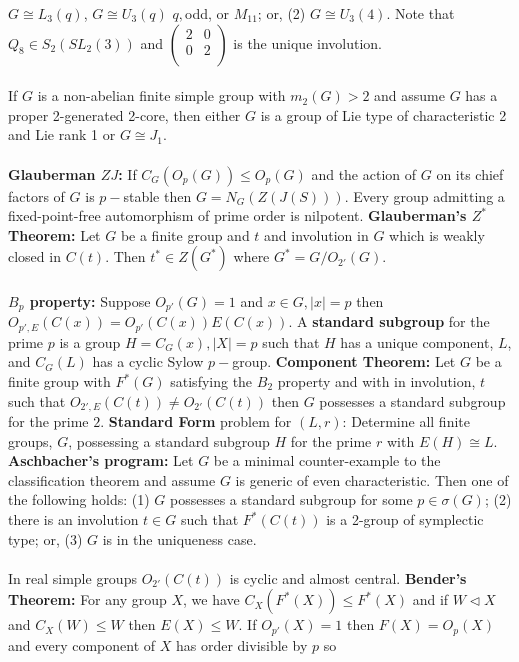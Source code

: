 $G \cong L_3(q)$,
$G \cong U_3(q)$ $q, $odd, or $M_{11}$; or,  (2)
$G \cong U_3(4)$.
Note that $Q_8 \in S_2(SL_2(3))$ and 
$\left(
\begin{array}{cc}
2 &  0 \\
0 &  2 \\
\end{array}
\right)$ is the unique involution.\\
\\
If $G$ is a non-abelian finite simple group
with $m_2(G) > 2$ and assume $G$ has a proper 2-generated 2-core, then either
$G$ is a group of Lie type of characteristic 2 and Lie rank 1 or $G \cong J_1$.\\
\\
{\bf Glauberman $ZJ$:}  If $C_G(O_p(G)) \le O_p(G)$ and the action of
$G$ on its chief factors of $G$ is $p-$stable then $G=N_G(Z(J(S)))$. Every group
admitting a fixed-point-free automorphism of prime order is nilpotent.
{\bf Glauberman's $Z^*$ Theorem:}
Let $G$ be a finite group and $t$ and involution in $G$ which is weakly closed in
$C(t)$.  Then $t^* \in Z(G^*)$  where $G^*= G/O_{2'} (G)$.\\
\\
{\bf $B_p$ property:} Suppose $O_{p'}(G)=1$ and $x \in G, |x|=p$ then
$O_{p',E}(C(x))= O_{p'}(C(x))E(C(x))$.
A {\bf standard subgroup} for the prime $p$ is a group $H=C_G(x), |X|=p$ such that
$H$ has a unique component, $L$, and $C_G(L)$ has a cyclic Sylow $p-$group.
{\bf Component Theorem:}
Let $G$ be a finite group with $F^*(G)$ satisfying the $B_2$ property and with
in involution, $t$ such that $O_{2', E} (C(t)) \ne O_{2'} (C(t))$ then $G$ possesses
a standard subgroup for the prime $2$.
{\bf Standard Form} problem for $(L,r)$:   Determine all finite groups, $G$, possessing a 
standard subgroup $H$ for the prime $r$ with $E(H) \cong L$. {\bf Aschbacher's program:}
Let $G$ be a minimal counter-example to the classification theorem and assume $G$ 
is generic of even characteristic.  
Then one of the following holds: (1) $G$ possesses a standard subgroup for some
$p \in \sigma(G)$; (2) there is an involution $t \in G$ such that $F^* (C(t))$ is a 
2-group of symplectic type; or, (3) $G$ is in the uniqueness case.\\
\\
In real simple groups $O_{2'}(C(t))$ is cyclic and almost central.
{\bf Bender's Theorem:} For any group $X$, we have $C_X(F^*(X)) \le F^*(X)$ and if
$W \lhd X$ and $C_X(W) \le W$ then $E(X) \le W$.  If $O_{p'}(X)=1$ then
$F(X)=O_p(X)$ and every component of $X$ has order divisible by $p$ so
